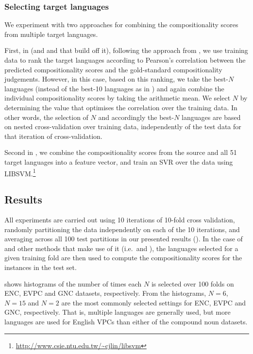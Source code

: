 \documentclass[output=paper
,modfonts
,nonflat]{langsci/langscibook}
\begin{document}
\subsubsection{Selecting target languages}
\label{sec:lang-selection}

We experiment with two approaches for combining the compositionality
scores from multiple target languages.

First, in \CStarg (and \CSsourcetarg and \CSall that build off it),
following the approach from , we use
training data to rank the target languages according to Pearson's
correlation between the predicted compositionality scores and the
gold-standard compositionality judgements. However, in this case,
based on this ranking, we take the best-$N$ languages (instead of the
best-10 languages as in ) and again
combine the individual compositionality scores by taking the
arithmetic mean. We select $N$ by determining the value that optimises
the correlation over the training data. In other words, the selection
of $N$ and accordingly the best-$N$ languages are based on nested
cross-validation over training data, independently of the test data
for that iteration of cross-validation.

Second in \CSsvr, we combine the compositionality scores from the
source and all 51 target languages into a feature vector, and train an
SVR over the data using
LIBSVM.\footnote{\smaller\url{http://www.csie.ntu.edu.tw/~cjlin/libsvm}}


\subsection{Results}

All experiments are carried out using 10 iterations of 10-fold cross
validation, randomly partitioning the data independently on each of the
10 iterations, and averaging across all 100 test partitions in our
presented results (). In the case of \CStarg and other methods that make
use of it (i.e.\ \CSsourcetarg and \CSall), the languages selected for a
given training fold are then used to compute the compositionality scores
for the instances in the test set. 

 shows histograms of the number of times each
$N$ is selected over 100 folds on ENC, EVPC and GNC datasets,
respectively. From the histograms, $N=6$, $N=15$ and $N=2$ are the
most commonly selected settings for ENC, EVPC and GNC,
respectively. That is, multiple languages are generally used, but more
languages are used for English VPCs than either of the compound noun
datasets.
\end{document}
